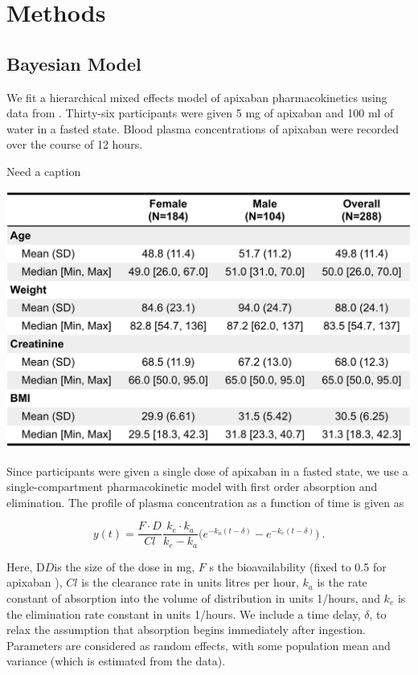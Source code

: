 \section{Methods}

\subsection*{Bayesian Model}

We fit a hierarchical mixed effects model of apixaban pharmacokinetics using data from \cite{Beaton2018-el}.  Thirty-six participants were given 5 mg of apixaban and 100 ml of water in a fasted state. Blood plasma concentrations of apixaban were recorded over the course of 12 hours.



\begin{table}[htb]
	\centering
	\caption{Need a caption} 
	\label{tab:my table} 
	\includegraphics[width=0.7\linewidth]{figs/table1}
\end{table}


\noindent Since participants were given a single dose of apixaban in a fasted state, we use a single-compartment pharmacokinetic model with first order absorption and elimination. The profile of plasma concentration as a function of time is given as

\begin{equation} \label{eq:eq_1}
y(t) = \dfrac{F \cdot D}{Cl} \dfrac{k_e \cdot k_a}{k_e - k_a}\Bigg( e^{-k_a (t-\delta)} - e^{-k_e(t-\delta)} \Bigg) \>.
\end{equation}

\noindent Here, D$D$is the size of the dose in mg, $F$ s the bioavailability (fixed to 0.5 for apixaban \cite{Byon2019-gf} ), $Cl$ is the clearance rate in units litres per hour, $k_a$ is the rate constant of absorption into the volume of distribution in units 1/hours, and $k_e$ is the elimination rate constant in units 1/hours. We include a time delay, $\delta$, to relax the assumption that absorption begins immediately after ingestion.  Parameters are considered as random effects, with some population mean and variance (which is estimated from the data). 


